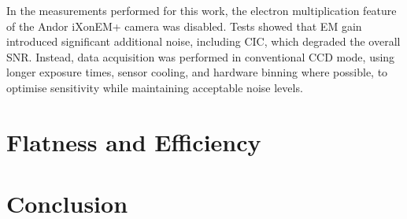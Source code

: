 \documentclass[
	parskip=half,
	a4paper,
]{scrarticle}
\begin{document}
In the measurements performed for this work, the electron multiplication feature of the Andor iXonEM+ camera was disabled. Tests showed that EM gain introduced significant additional noise, including CIC, which degraded the overall SNR. Instead, data acquisition was performed in conventional CCD mode, using longer exposure times, sensor cooling, and hardware binning where possible, to optimise sensitivity while maintaining acceptable noise levels.




\section{Flatness and Efficiency}

\section*{Conclusion}

\clearpage
\printbibliography
\end{document}
